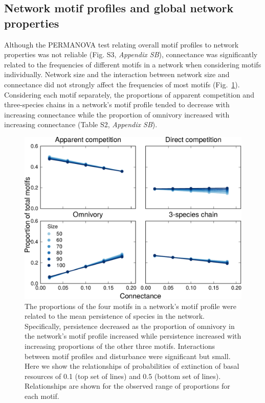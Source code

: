 \documentclass[12pt]{article}
\begin{document}
\begin{spacing}{2.0}
    \subsection*{Network motif profiles and global network properties}

        Although the PERMANOVA test relating overall motif profiles to network properties was not reliable (Fig. S3, \emph{Appendix SB}), 
        connectance was significantly related to the frequencies of different motifs in a network when considering motifs individually.
        Network size and the interaction between network size and connectance did not strongly affect the frequencies of most motifs (Fig.~\ref{motif_proportion_lms}).
        Considering each motif separately, the proportions of apparent competition and three-species chains in a network's motif profile tended to decrease with increasing connectance while the proportion of omnivory increased with increasing connectance (Table S2, \emph{Appendix SB}). 
    
        \begin{figure}[h!]
            \centering
            \includegraphics[width=.75\textwidth]{manuscript/figures/motif_proportion_lms.pdf}
            \caption{The proportions of the four motifs in a network's motif profile were related to the mean persistence of species in the network. Specifically, persistence decreased as the proportion of omnivory in the network's motif profile increased while persistence increased with increasing proportions of the other three motifs. Interactions between motif profiles and disturbance were significant but small. Here we show the relationships of probabilities of extinction of basal resources of 0.1 (top set of lines) and 0.5 (bottom set of lines). Relationships are shown for the observed range of proportions for each motif.}
            \label{motif_proportion_lms}
        \end{figure}



\end{spacing}
\end{document}

